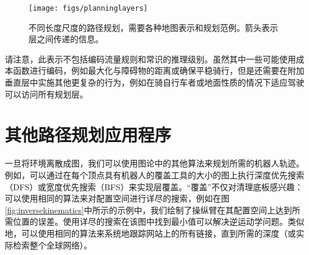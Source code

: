 \begin{figure}
\centering
\texttt{[image: figs/planninglayers]}
\caption{不同长度尺度的路径规划，需要各种地图表示和规划范例。箭头表示层之间传递的信息。
\label{fig:planninglayers}}
\end{figure}


请注意，此表示不包括编码流量规则和常识的推理级别。虽然其中一些可能使用成本函数进行编码，例如最大化与障碍物的距离或确保平稳骑行，但是还需要在附加垂直层中实施其他更复杂的行为，例如在骑自行车者或地面性质的情况下适应驾驶 可以访问所有规划层。



\section{其他路径规划应用程序}
一旦将环境离散成图，我们可以使用图论中的其他算法来规划所需的机器人轨迹。例如，可以通过在每个顶点具有机器人的覆盖工具的大小的图上执行深度优先搜索（DFS）或宽度优先搜索（BFS）来实现层覆盖。“覆盖”不仅对清理底板感兴趣：可以使用相同的算法来对配置空间进行详尽的搜索，例如在图\ref{fig:inversekinematics}中所示的示例中，我们绘制了操纵臂在其配置空间上达到所需位置的误差。使用详尽的搜索在该图中找到最小值可以解决逆运动学问题。类似地，可以使用相同的算法来系统地跟踪网站上的所有链接，直到所需的深度（或实际检索整个全球网络）。

